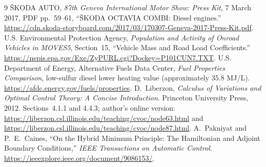\documentclass[10pt,a4paper]{article}
\begin{document}
\begin{thebibliography}{9}
\v{S}KODA AUTO, \emph{87th Geneva International Motor Show: Press Kit}, 7 March 2017, PDF pp.~59--61, ``\v{S}KODA OCTAVIA COMBI: Diesel engines.''
\url{https://cdn.skoda-storyboard.com/2017/03/170307-Geneva-2017-Press-Kit.pdf}.
U.S. Environmental Protection Agency, \emph{Population and Activity of Onroad Vehicles in MOVES5}, Section~15, ``Vehicle Mass and Road Load Coefficients.''
\url{https://nepis.epa.gov/Exe/ZyPURL.cgi?Dockey=P101CUN7.TXT}.
U.S. Department of Energy, Alternative Fuels Data Center, \emph{Fuel Properties Comparison}, low-sulfur diesel lower heating value (approximately 35.8 MJ/L).
\url{https://afdc.energy.gov/fuels/properties}.
D.~Liberzon, \emph{Calculus of Variations and Optimal Control Theory: A Concise Introduction}. Princeton University Press, 2012. Sections~4.1.1 and 4.4.3; author's online version:
\url{https://liberzon.csl.illinois.edu/teaching/cvoc/node63.html} and
\url{https://liberzon.csl.illinois.edu/teaching/cvoc/node87.html}.
A.~Pakniyat and P.~E.~Caines, ``On the Hybrid Minimum Principle: The Hamiltonian and Adjoint Boundary Conditions,'' \emph{IEEE Transactions on Automatic Control}.
\url{https://ieeexplore.ieee.org/document/9086153/}.
\end{thebibliography}
\end{document}
